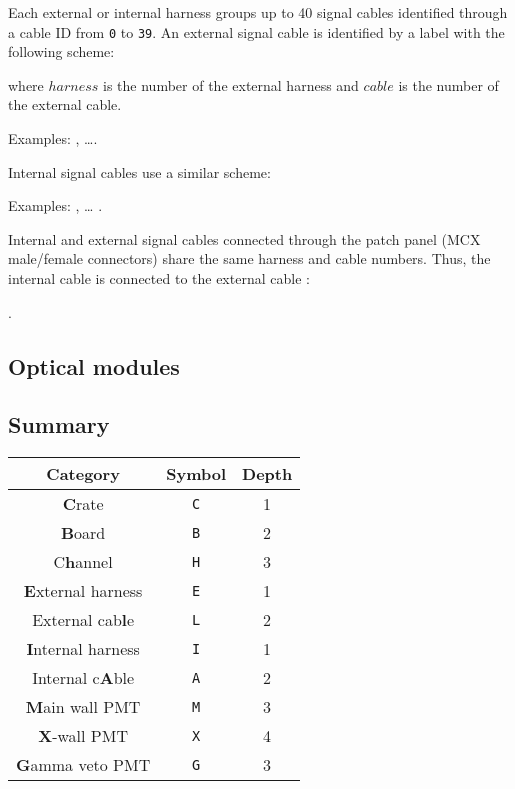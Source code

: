 \vskip 10pt Each  external or internal harness groups up  to 40 signal
cables identified through  a cable ID from  \texttt{0} to \texttt{39}.
An external signal  cable is identified by a label  with the following
scheme:
\begin{center}
 \end{center}
where \texttt{$harness$}  is the  number of  the external  harness and
\texttt{$cable$} is  the number of the  external cable.  \par\noindent
Examples: , \dots {}.

\vskip 10pt Internal signal cables use a similar scheme:
\begin{center}
\end{center}
\par\noindent Examples: , \dots
{}.

Internal and external signal cables  connected through the patch panel
(MCX male/female connectors) share the same harness and cable numbers.
Thus, the  internal cable   is connected  to the
external cable :
\begin{center}
.
\end{center}


\subsection{Optical modules}



\subsection{Summary}

\begin{center}
\begin{tabular}{|c|c|c|}
  \hline
  Category & Symbol & Depth \\
  \hline
  \hline
  \textbf{C}rate & \texttt{C} & 1 \\
  \hline
  \textbf{B}oard & \texttt{B} & 2 \\
  \hline
  C\textbf{h}annel & \texttt{H} & 3 \\
  \hline
  \textbf{E}xternal harness & \texttt{E} & 1 \\
  \hline
  External cab\textbf{l}e & \texttt{L} & 2 \\
  \hline
  \textbf{I}nternal harness & \texttt{I} & 1 \\
  \hline
  Internal c\textbf{A}ble & \texttt{A} & 2 \\
  \hline
  \textbf{M}ain wall PMT & \texttt{M} & 3 \\
  \hline
  \textbf{X}-wall PMT & \texttt{X} & 4 \\
  \hline
  \textbf{G}amma veto PMT & \texttt{G} & 3 \\
  \hline
\end{tabular}
\end{center}

